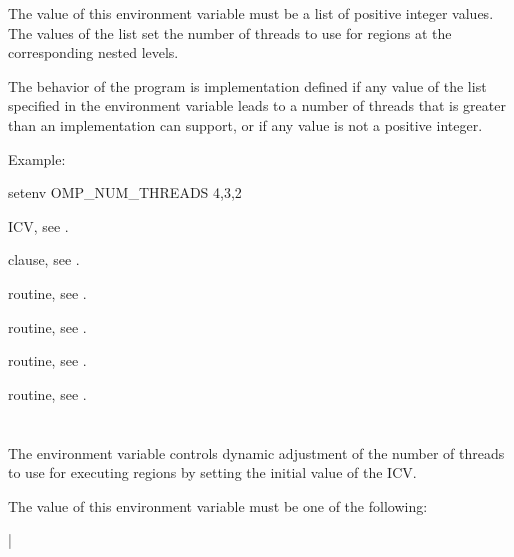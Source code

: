 The value of this environment variable must be a list of positive integer 
values. The values of the list set the number of threads to use for 
 regions at the corresponding nested levels.

The behavior of the program is implementation defined if any value of the 
list specified in the  environment variable leads to 
a number of threads that is greater than an implementation can support, or 
if any value is not a positive integer.

Example:
\begin{ompEnv}
setenv OMP_NUM_THREADS 4,3,2
\end{ompEnv}

\begin{crossrefs}
\item {} ICV, see .

\item {} clause, see .

\item {} routine, see .

\item {} routine, see .

\item {} routine, see .

\item {} routine, see .
\end{crossrefs}



\section{}
\label{sec:OMP_DYNAMIC}
The  environment variable controls dynamic adjustment 
of the number of threads to use for executing  regions by 
setting the initial value of the  ICV. 

The value of this environment variable must be one of the following:

{|} 

